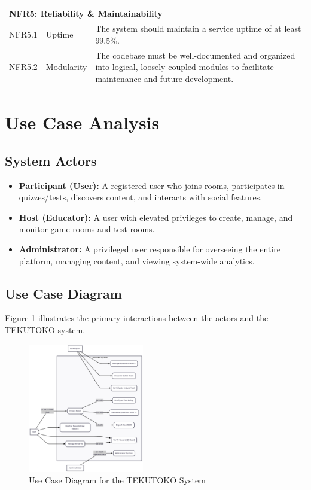 \begin{longtable}{l l p{9cm}}
\multicolumn{3}{l}{\textbf{NFR5: Reliability \& Maintainability}} \\
\midrule
NFR5.1 & Uptime & The system should maintain a service uptime of at least 99.5\%. \\
NFR5.2 & Modularity & The codebase must be well-documented and organized into logical, loosely coupled modules to facilitate maintenance and future development. \\

\end{longtable}


\FloatBarrier
\section{Use Case Analysis}
\label{sec:use-case}

\subsection{System Actors}
\begin{itemize}
    \item \textbf{Participant (User):} A registered user who joins rooms, participates in quizzes/tests, discovers content, and interacts with social features.
    \item \textbf{Host (Educator):} A user with elevated privileges to create, manage, and monitor game rooms and test rooms.
    \item \textbf{Administrator:} A privileged user responsible for overseeing the entire platform, managing content, and viewing system-wide analytics.
\end{itemize}

\subsection{Use Case Diagram}
Figure \ref{fig:use-case-diagram} illustrates the primary interactions between the actors and the TEKUTOKO system.

\begin{figure}[htbp]
\centering
\includegraphics[width=0.45\textwidth]{figures/use-case-diagram.png}
\caption{Use Case Diagram for the TEKUTOKO System}
\label{fig:use-case-diagram}
\end{figure}

